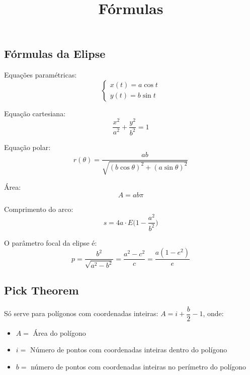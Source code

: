 \documentclass[12pt]{article}
\title{Fórmulas}
\begin{document}




% 


% 



\subsection*{Fórmulas da Elipse}

Equações paramétricas: $$\begin{cases} x(t) = a \cos t \\ y(t) = b \sin t \end{cases}$$

Equação cartesiana: $$\dfrac{x^2}{a^2} + \dfrac{y^2}{b^2} = 1 $$

Equação polar: $$ r(\theta) = \dfrac{ab}{\sqrt{(b \cos \theta)^2 + (a \sin \theta)^2 }} $$

Área: $$ A = ab\pi $$ 

Comprimento do arco: $$ s = 4a \cdot E\Big(1 - \dfrac{a^2}{b^2}\Big)$$

O parâmetro focal da elipse é: $$p = \dfrac{b^2}{\sqrt{a^2-b^2}} = \dfrac{a^2-c^2}{c} = \dfrac{a(1-e^2)}{e}$$

\subsection*{Pick Theorem}

Só serve para polígonos com coordenadas inteiras: $A = i + \dfrac{b}{2} - 1$, onde:

\begin{itemize}
    \item $A = $ Área do polígono
    \item $i = $ Número de pontos com coordenadas inteiras dentro do polígono
    \item $b = $ número de pontos com coordenadas inteiras no perímetro do polígono
\end{itemize}
\end{document}
